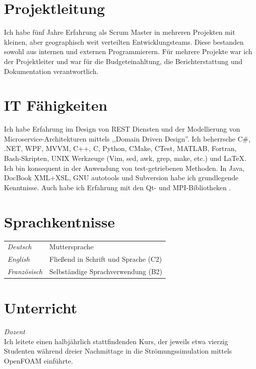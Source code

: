 \documentclass[line,11pt,a4paper]{../resume}
\begin{document}
\begin{resume}
\section{\mysidestyle Projektleitung}\vspace{2mm}
Ich habe fünf Jahre Erfahrung als Scrum Master in mehreren Projekten mit
kleinen, aber geographisch weit verteilten Entwicklungsteams. Diese bestanden
sowohl aus internen und externen Programmierern. Für mehrere Projekte war ich
der Projektleiter und war für die Budgeteinahltung, die Berichterstattung und
Dokumentation verantwortlich.

\section{\mysidestyle IT Fähigkeiten}\vspace{2mm}
Ich habe Erfahrung im Design von REST Diensten und der Modellierung von
Microservice-Architekturen mittels ,,Domain Driven Design''. Ich beherrsche
C\#, .NET, WPF, MVVM, C++, C, Python, CMake, CTest, MATLAB, Fortran,
Bash-Skripten, UNIX Werkzeuge (Vim, sed, awk, grep, make, etc.) und
{\selectfont\LaTeX}. Ich bin konsequent in der Anwendung von
test-getriebenen Methoden. In Java, DocBook XML+XSL, GNU autotools und
Subversion habe ich grundlegende Kenntnisse. Auch habe ich Erfahrung mit den
Qt- und MPI-Bibliotheken .

\section{\mysidestyle Sprachkentnisse}\vspace{2mm}
\begin{tabular}{@{}ll}
  \textsl{Deutsch}   & Muttersprache \\
  \textsl{English}  & Flie{\ss}end in Schrift und Sprache (C2) \\
  \textsl{Französisch}  & Selbständige Sprachverwendung (B2) \\
\end{tabular}

\section{\mysidestyle Unterricht}\vspace{2mm}

\textsl{Dozent}\\
Ich leitete einen halbjährlich stattfindenden Kurs, der jeweils etwa vierzig
Studenten während dreier Nachmittage in die Strömungssimulation mittels
OpenFOAM einführte.


\end{resume}
\end{document}

